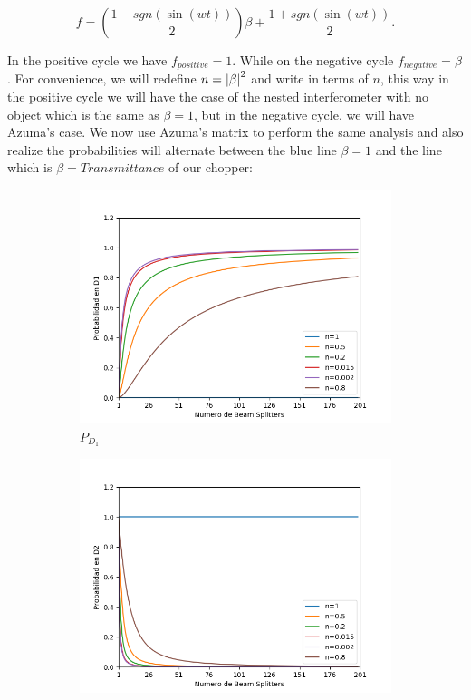 \documentclass{book}
\begin{document}
\begin{equation}
f=\left(\frac{1-sgn(\sin(wt))}{2} \right)\beta+\frac{1+sgn(\sin(wt))}{2}.
\end{equation}

In the positive cycle we have $f_{positive}=1$. While on the negative cycle $f_{negative}=\beta$. For convenience, we will redefine $n=\abs{\beta}^{2}$ and write in terms of $n$, this way in the positive cycle we will have the case of the nested interferometer with no object which is the same as  $\beta=1$, but in the negative cycle, we will have  Azuma's case. We now use Azuma's matrix to perform the same analysis and also realize the probabilities will alternate between the blue line $\beta=1$ and the line which is $\beta=Transmittance$ of our chopper:


 \begin{figure}[!htb]
\centering
\begin{subfigure}[b]{0.3\linewidth}
\includegraphics[width=\linewidth]{images/ChopperD1.png}
\caption{$P_{D_{1}}$}
\label{fig:BS1}
\end{subfigure}
\begin{subfigure}[b]{0.3\linewidth}
\includegraphics[width=\linewidth]{images/ChopperD2.png}

\end{subfigure}
\end{figure}
\end{document}
